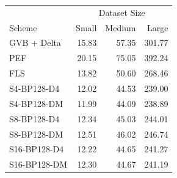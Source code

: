 \begin{tabular}{lrrr}
\toprule
 & \multicolumn{3}{c}{Dataset Size} \\
Scheme & Small & Medium & Large \\
\midrule
GVB + Delta & 15.83 & 57.35 & 301.77 \\
PEF & 20.15 & 75.05 & 392.24 \\
FLS & 13.82 & 50.60 & 268.46 \\
S4-BP128-D4 & 12.02 & 44.53 & 239.00 \\
S4-BP128-DM & 11.99 & 44.09 & 238.89 \\
S8-BP128-D4 & 12.34 & 45.03 & 244.01 \\
S8-BP128-DM & 12.51 & 46.02 & 246.74 \\
S16-BP128-D4 & 12.22 & 44.65 & 241.27 \\
S16-BP128-DM & 12.30 & 44.67 & 241.19 \\
\bottomrule
\end{tabular}
